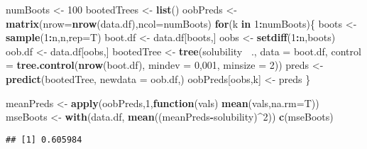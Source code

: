 \documentclass[]{article}
\newenvironment{Shaded}{\begin{snugshade}}{\end{snugshade}}
\newcommand{\ControlFlowTok}[1]{\textcolor[rgb]{0.13,0.29,0.53}{\textbf{#1}}}
\newcommand{\DataTypeTok}[1]{\textcolor[rgb]{0.13,0.29,0.53}{#1}}
\newcommand{\DecValTok}[1]{\textcolor[rgb]{0.00,0.00,0.81}{#1}}
\newcommand{\KeywordTok}[1]{\textcolor[rgb]{0.13,0.29,0.53}{\textbf{#1}}}
\newcommand{\NormalTok}[1]{#1}
\newcommand{\OperatorTok}[1]{\textcolor[rgb]{0.81,0.36,0.00}{\textbf{#1}}}
\newcommand{\StringTok}[1]{\textcolor[rgb]{0.31,0.60,0.02}{#1}}
\begin{document}
\begin{Shaded}
\begin{Highlighting}[]
\NormalTok{numBoots <-}\StringTok{ }\DecValTok{100}
\NormalTok{bootedTrees <-}\StringTok{ }\KeywordTok{list}\NormalTok{()}
\NormalTok{oobPreds <-}\StringTok{ }\KeywordTok{matrix}\NormalTok{(}\DataTypeTok{nrow=}\KeywordTok{nrow}\NormalTok{(data.df),}\DataTypeTok{ncol=}\NormalTok{numBoots) }
\ControlFlowTok{for}\NormalTok{(k }\ControlFlowTok{in} \DecValTok{1}\OperatorTok{:}\NormalTok{numBoots)\{}
\NormalTok{  boots <-}\StringTok{ }\KeywordTok{sample}\NormalTok{(}\DecValTok{1}\OperatorTok{:}\NormalTok{n,n,}\DataTypeTok{rep=}\NormalTok{T) }
\NormalTok{  boot.df <-}\StringTok{ }\NormalTok{data.df[boots,]}
\NormalTok{  oobs <-}\StringTok{ }\KeywordTok{setdiff}\NormalTok{(}\DecValTok{1}\OperatorTok{:}\NormalTok{n,boots) }
\NormalTok{  oob.df <-}\StringTok{ }\NormalTok{data.df[oobs,] }
\NormalTok{  bootedTree <-}\StringTok{ }\KeywordTok{tree}\NormalTok{(solubility }\OperatorTok{~}\NormalTok{.,}
                     \DataTypeTok{data =}\NormalTok{ boot.df,}
                     \DataTypeTok{control =} \KeywordTok{tree.control}\NormalTok{(}\KeywordTok{nrow}\NormalTok{(boot.df),}
                                            \DataTypeTok{mindev =} \DecValTok{0}\NormalTok{,}\DecValTok{001}\NormalTok{,}
                                            \DataTypeTok{minsize =} \DecValTok{2}\NormalTok{))}
\NormalTok{  preds <-}\StringTok{ }\KeywordTok{predict}\NormalTok{(bootedTree,}
                   \DataTypeTok{newdata =}\NormalTok{ oob.df,)}
\NormalTok{  oobPreds[oobs,k] <-}\StringTok{ }\NormalTok{preds}
\NormalTok{\}}

\NormalTok{meanPreds <-}\StringTok{ }\KeywordTok{apply}\NormalTok{(oobPreds,}\DecValTok{1}\NormalTok{,}\ControlFlowTok{function}\NormalTok{(vals) }\KeywordTok{mean}\NormalTok{(vals,}\DataTypeTok{na.rm=}\NormalTok{T)) }
\NormalTok{mseBoots <-}\StringTok{ }\KeywordTok{with}\NormalTok{(data.df, }\KeywordTok{mean}\NormalTok{((meanPreds}\OperatorTok{-}\NormalTok{solubility)}\OperatorTok{^}\DecValTok{2}\NormalTok{))}
\KeywordTok{c}\NormalTok{(mseBoots)}
\end{Highlighting}
\end{Shaded}

\begin{verbatim}
## [1] 0.605984
\end{verbatim}
\end{document}
